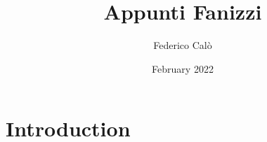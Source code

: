 \documentclass{article}
\title{Appunti Fanizzi}
\author{Federico Calò}
\date{February 2022}
\begin{document}
\maketitle

\section{Introduction}
\end{document}
